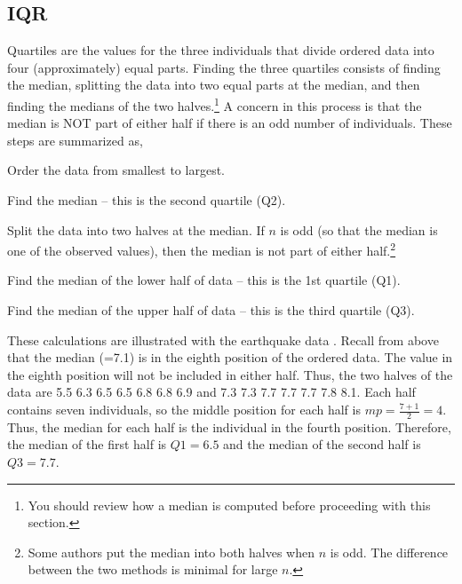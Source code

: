 \documentclass[10pt,openany]{book}\usepackage[]{graphicx}\usepackage[]{color}
\begin{document}

\vspace{-12pt}

\subsection{IQR}
Quartiles are the values for the three individuals that divide ordered data into four (approximately) equal parts.  Finding the three quartiles consists of finding the median, splitting the data into two equal parts at the median, and then finding the medians of the two halves.\footnote{You should review how a median is computed before proceeding with this section.}  A concern in this process is that the median is NOT part of either half if there is an odd number of individuals.  These steps are summarized as,
\begin{Enumerate}
  \item Order the data from smallest to largest.
  \item Find the median -- this is the second quartile (Q2).
  \item Split the data into two halves at the median.  If $n$ is odd (so that the median is one of the observed values), then the median is not part of either half.\footnote{Some authors put the median into both halves when $n$ is odd.  The difference between the two methods is minimal for large $n$.}
  \item Find the median of the lower half of data -- this is the 1st quartile (Q1).
  \item Find the median of the upper half of data -- this is the third quartile (Q3).
\end{Enumerate}

These calculations are illustrated with the earthquake data .  Recall from above  that the median (=7.1) is in the eighth position of the ordered data.  The value in the eighth position will not be included in either half.  Thus, the two halves of the data are 5.5 6.3 6.5 6.5 6.8 6.8 6.9 and 7.3 7.3 7.7 7.7 7.7 7.8 8.1.  Each half contains seven individuals, so the middle position for each half is $mp=\frac{7+1}{2}=4$.  Thus, the median for each half is the individual in the fourth position.  Therefore, the median of the first half is $Q1=6.5$ and the median of the second half is $Q3=7.7$.
\end{document}
